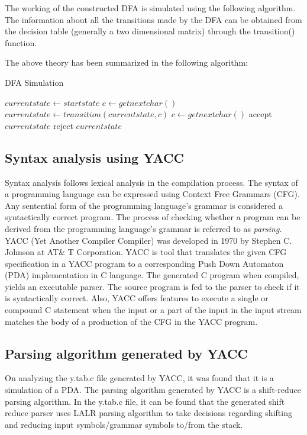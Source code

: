 The working of the constructed DFA is simulated using the following algorithm.
The information about all the transitions made by the DFA can be obtained from the decision table (generally a two dimensional matrix) through the transition() function. 

The above theory has been summarized in the following algorithm:
\
\
\begin{algorithm}
\caption{DFA Simulation}
\begin{algorithmic}
\STATE $currentstate \leftarrow startstate$
\STATE $c \leftarrow getnextchar()$
\WHILE{ $c \neq EOF$ } 
\STATE $currentstate \leftarrow transition(currentstate,c)$
\STATE $c \leftarrow getnextchar()$
\IF {$currentstate \quad \epsilon \quad finalstates[\,]$}
\STATE accept $currentstate$ 
\ELSE
\STATE reject $currentstate$ 
\ENDIF
\ENDWHILE
\end{algorithmic} 	
\end{algorithm}
\subsection{Syntax analysis using YACC}
Syntax analysis follows lexical analysis in the compilation process. The syntax of a programming language can be expressed using Context Free Grammars (CFG). Any sentential form of the programming language's grammar is considered a syntactically correct program. The process of checking whether a program can be derived from the programming language's grammar is referred to as \textit{parsing}. 
YACC (Yet Another Compiler Compiler) was developed in 1970 by Stephen C. Johnson at AT\& T  Corporation. YACC is tool that translates the given CFG specification in a YACC program to a corresponding Push Down Automaton (PDA) implementation in C language. The generated C program when compiled, yields an executable parser. The source program is fed to the parser to check if it is syntactically correct. 
Also, YACC offers features to execute a single or compound C statement when the input or a part of the input in the input stream matches the body of a production of the CFG in the YACC program. 

\subsection{Parsing algorithm generated by YACC}
On analyzing the y.tab.c file generated by YACC, it was found that it is a simulation of a PDA. The parsing algorithm generated by YACC is a shift-reduce parsing algorithm. In the y.tab.c file, it can be found that the generated shift reduce parser uses LALR parsing algorithm to take decisions regarding shifting and reducing input symbols/grammar symbols to/from the stack\cite{citation-1-name-here}.
 
